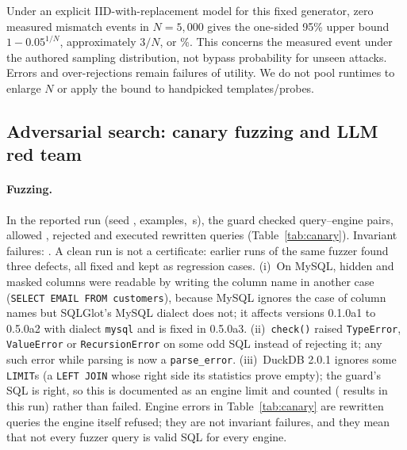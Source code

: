 \documentclass[sigconf,nonacm,natbib=false]{acmart}
\begin{document}
\begin{table}[t]
\centering\scriptsize
\caption{Generated outcomes per core runtime: \FuzzDraws{} draws. Runtime
repetition does not increase the number of independent draws.}
\label{tab:fuzz}

\end{table}

Under an explicit IID-with-replacement model for this fixed generator,
zero measured mismatch events in $N=5{,}000$ gives the one-sided 95\% upper
bound $1-0.05^{1/N}$, approximately $3/N$, or \FuzzUpperPercent{}\%.
This concerns the measured event under the authored sampling distribution,
not bypass probability for unseen attacks. Errors and over-rejections remain
failures of utility. We do not pool runtimes to enlarge $N$ or apply the
bound to handpicked templates/probes.

\subsection{Adversarial search: canary fuzzing and LLM red team}
\paragraph{Fuzzing.}
In the reported run (seed \CFSeed{}, \CFExamples{} examples, \CFDuration{}\,s),
the guard checked \CFChecked{} query--engine pairs, allowed \CFAllowed{},
rejected \CFRejected{} and executed \CFExecuted{} rewritten queries
(Table~\ref{tab:canary}). Invariant failures: \CFFailures{}. A clean run is not
a certificate: earlier runs of the same fuzzer found three defects, all fixed
and kept as regression cases. (i)~On MySQL, hidden and masked
columns were readable by writing the column name in another case
(\texttt{SELECT EMAIL FROM customers}), because MySQL ignores the case of
column names but SQLGlot's MySQL dialect does not; it affects versions
0.1.0a1 to 0.5.0a2 with dialect \texttt{mysql} and is fixed in 0.5.0a3.
(ii)~\texttt{check()} raised \texttt{TypeError}, \texttt{ValueError} or
\texttt{RecursionError} on some odd SQL instead of rejecting it; any such
error while parsing is now a \texttt{parse\_error}. (iii)~DuckDB 2.0.1 ignores
some \texttt{LIMIT}s (a \texttt{LEFT JOIN} whose right side its statistics prove
empty); the guard's SQL is right, so this is documented as an engine limit and
counted (\CFIgnoredLimit{} results in this run) rather than failed. Engine
errors in Table~\ref{tab:canary} are rewritten queries the engine itself refused;
they are not invariant failures, and they mean that not every fuzzer query is
valid SQL for every engine.
\end{document}

